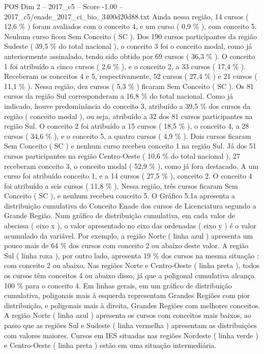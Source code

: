 \begin{textsample}{POS Dim 2 – 2017\_c5 – Score -1.00 – 2017\_c5/enade\_2017\_ci\_bio\_3400d20d88.txt}
Ainda nessa região, 14 cursos ( 12,6 \% ) foram avaliados com o conceito 4, e um curso ( 0,9 \% ), com conceito 5.
Nenhum curso ficou Sem Conceito ( SC ).
Dos 190 cursos participantes da região Sudeste ( 39,5 \% do total nacional ), o conceito 3 foi o conceito modal, como já anteriormente assinalado, tendo sido obtido por 69 cursos ( 36,3 \% ).
O conceito 1 foi atribuído a cinco cursos ( 2,6 \% ), e o conceito 2, a 33 cursos ( 17,4 \% ).
Receberam os conceitos 4 e 5, respectivamente, 52 cursos ( 27,4 \% ) e 21 cursos ( 11,1 \% ).
Nessa região, dez cursos ( 5,3 \% ) ficaram Sem Conceito ( SC ).
Os 81 cursos da região Sul corresponderam a 16,8 \% do total nacional.
Como já indicado, houve predominância do conceito 3, atribuído a 39,5 \% dos cursos da região ( conceito modal ), ou seja, atribuído a 32 dos 81 cursos participantes na região Sul.
O conceito 2 foi atribuído a 15 cursos ( 18,5 \% ), o conceito 4, a 28 cursos ( 34,6 \% ), e o conceito 5, a quatro cursos ( 4,9 \% ).
Dois cursos ficaram Sem Conceito ( SC ) e nenhum curso recebeu conceito 1 na região Sul.
Já dos 51 cursos participantes na região Centro-Oeste ( 10,6 \% do total nacional ), 27 receberam conceito 3, o conceito modal ( 52,9 \% ), como já fora destacado.
A um curso foi atribuído conceito 1, e a 14 cursos ( 27,5 \% ), conceito 2.
O conceito 4 foi atribuído a seis cursos ( 11,8 \% ).
Nessa região, três cursos ficaram Sem Conceito ( SC ), e nenhum recebeu conceito 5.
O Gráfico 5.1a apresenta a distribuição cumulativa do Conceito Enade dos cursos de Licenciatura segundo a Grande Região.
Num gráfico de distribuição cumulativa, em cada valor de abscissa ( eixo x ), o valor apresentado no eixo das ordenadas ( eixo y ) é o valor acumulado da variável.
Por exemplo, a região Norte ( linha azul ) apresenta um pouco mais de 64 \% dos cursos com conceito 2 ou abaixo deste valor.
A região Sul ( linha roxa ), por outro lado, apresenta 19 \% dos cursos na mesma situação : com conceito 2 ou abaixo.
Nas regiões Norte e Centro-Oeste ( linha preta ), todos os cursos têm conceitos 4 ou abaixo disso, já que a poligonal cumulativa alcança 100 \% para o conceito 4.
Em linhas gerais, em um gráfico de distribuição cumulativa, poligonais mais à esquerda representam Grandes Regiões com pior distribuição, e poligonais mais à direita, Grandes Regiões com melhores conceitos.
A região Norte ( linha azul ) apresenta os cursos com conceitos mais baixos, ao passo que as regiões Sul e Sudeste ( linha vermelha ) apresentam as distribuições com valores maiores.
Cursos em IES situadas nas regiões Nordeste ( linha verde ) e Centro-Oeste ( linha preta ) estão em uma situação intermediária.

\end{textsample}
